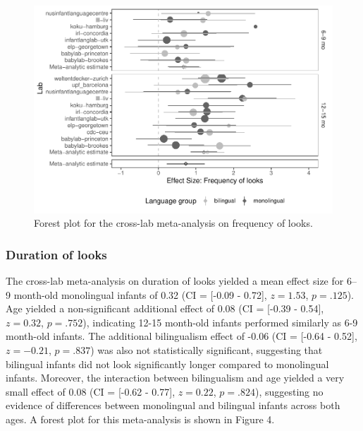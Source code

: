 \documentclass[,man,floatsintext]{apa6}
\begin{document}
\begin{figure}
\centering
\includegraphics{gaze-following-paper_files/figure-latex/fig3-1.pdf}
\caption{\label{fig:fig3}Forest plot for the cross-lab meta-analysis on frequency of looks.}
\end{figure}

\hypertarget{duration-of-looks-1}{%
\subsubsection{Duration of looks}\label{duration-of-looks-1}}

The cross-lab meta-analysis on duration of looks yielded a mean effect size for 6--9 month-old monolingual infants of 0.32 (CI = {[}-0.09 - 0.72{]}, \(z = 1.53\), \(p = .125\)). Age yielded a non-significant additional effect of 0.08 (CI = {[}-0.39 - 0.54{]}, \(z = 0.32\), \(p = .752\)), indicating 12-15 month-old infants performed similarly as 6-9 month-old infants. The additional bilingualism effect of -0.06 (CI = {[}-0.64 - 0.52{]}, \(z = -0.21\), \(p = .837\)) was also not statistically significant, suggesting that bilingual infants did not look significantly longer compared to monolingual infants. Moreover, the interaction between bilingualism and age yielded a very small effect of 0.08 (CI = {[}-0.62 - 0.77{]}, \(z = 0.22\), \(p = .824\)), suggesting no evidence of differences between monolingual and bilingual infants across both ages. A forest plot for this meta-analysis is shown in Figure 4.
\end{document}
